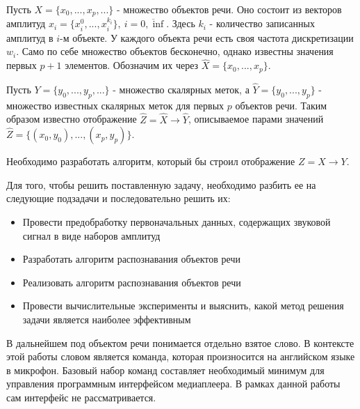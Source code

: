 Пусть $X=\{x_0, ..., x_p, ...\}$ - множество объектов речи. Оно состоит из векторов амплитуд $x_i=\{x_i^0, ..., x_i^{k_i}\},~i=\overline{0,\inf}$. Здесь $k_i$ - количество записанных амплитуд в $i$-м объекте. У каждого объекта речи есть своя частота дискретизации $w_i$. Само по себе множество объектов бесконечно, однако известны значения первых $p+1$ элементов. Обозначим их через $\widehat{X}=\{x_0, ..., x_p\}$.  

Пусть $Y=\{y_0, ..., y_p, ...\}$ - множество скалярных меток, а $\widehat{Y}=\{y_0, ..., y_p\}$ - множество известных скалярных меток для первых $p$ объектов речи. Таким образом известно отображение $\widehat{Z}=\widehat{X} \rightarrow \widehat{Y}$, описываемое парами значений $\widehat{Z}=\{(x_0, y_0), ..., (x_p, y_p)\}$.

Необходимо разработать алгоритм, который бы строил отображение $Z = X \rightarrow Y$.


Для того, чтобы решить поставленную задачу, необходимо разбить ее на следующие подзадачи и последовательно решить их:
\begin{itemize}[leftmargin=2cm]
\item Провести предобработку первоначальных данных, содержащих звуковой сигнал в виде наборов амплитуд
\item Разработать алгоритм распознавания объектов речи
\item Реализовать алгоритм распознавания объектов речи
\item Провести вычислительные эксперименты и выяснить, какой метод решения задачи является наиболее эффективным
\end{itemize}


В дальнейшем под объектом речи понимается отдельно взятое слово. В контексте этой работы словом является команда, которая произносится на английском языке в микрофон. Базовый набор команд составляет необходимый минимум для управления программным интерфейсом медиаплеера. В рамках данной работы сам интерфейс не рассматривается.